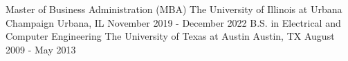 
\begin{cventries}

  \cventry
    {Master of Business Administration (MBA)}
    {The University of Illinois at Urbana Champaign}
    {Urbana, IL}
    {November 2019 - December 2022}
    {}
  \cventry
    {B.S. in Electrical and Computer Engineering}
    {The University of Texas at Austin}
    {Austin, TX}
    {August 2009 - May 2013}
    {}
\end{cventries}

